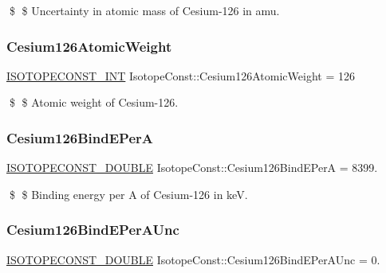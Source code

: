 \$ \$ Uncertainty in atomic mass of Cesium-\/126 in amu. \mbox{\label{group___isotope_const-_cesium-_cs126_gaff73133257912e7b26df0030bf9bfcc8}} 
\subsubsection{\texorpdfstring{Cesium126\+Atomic\+Weight}{Cesium126AtomicWeight}}
{\footnotesize\ttfamily \mbox{\hyperlink{group___isotope_const-_macros_ga5f18360b3e99483a35c32d789e62621c}{I\+S\+O\+T\+O\+P\+E\+C\+O\+N\+S\+T\+\_\+\+I\+NT}} Isotope\+Const\+::\+Cesium126\+Atomic\+Weight = 126}

\$ \$ Atomic weight of Cesium-\/126. \mbox{\label{group___isotope_const-_cesium-_cs126_ga172389d0fc5d16458b7176309f8043e6}} 
\subsubsection{\texorpdfstring{Cesium126\+Bind\+E\+PerA}{Cesium126BindEPerA}}
{\footnotesize\ttfamily \mbox{\hyperlink{group___isotope_const-_macros_ga8f45a7272ce02c0b4c65c44636ed719a}{I\+S\+O\+T\+O\+P\+E\+C\+O\+N\+S\+T\+\_\+\+D\+O\+U\+B\+LE}} Isotope\+Const\+::\+Cesium126\+Bind\+E\+PerA = 8399.}

\$ \$ Binding energy per A of Cesium-\/126 in keV. \mbox{\label{group___isotope_const-_cesium-_cs126_gaafe9ff2900f77aa60a617c15ec8b4d15}} 
\subsubsection{\texorpdfstring{Cesium126\+Bind\+E\+Per\+A\+Unc}{Cesium126BindEPerAUnc}}
{\footnotesize\ttfamily \mbox{\hyperlink{group___isotope_const-_macros_ga8f45a7272ce02c0b4c65c44636ed719a}{I\+S\+O\+T\+O\+P\+E\+C\+O\+N\+S\+T\+\_\+\+D\+O\+U\+B\+LE}} Isotope\+Const\+::\+Cesium126\+Bind\+E\+Per\+A\+Unc = 0.}

